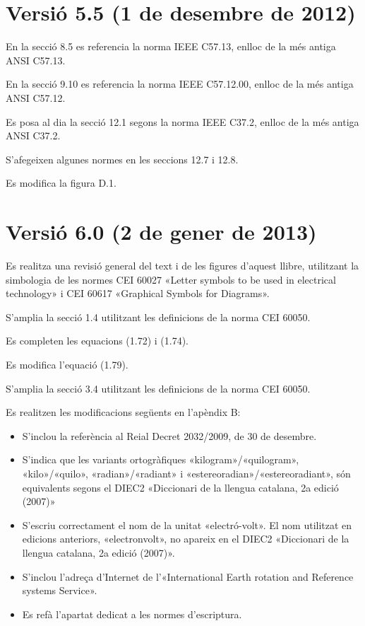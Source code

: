 \section*{Versió 5.5 (1 de desembre de 2012)}

En la secció 8.5 es referencia la norma  IEEE C57.13, enlloc de la més antiga ANSI C57.13.

En la secció 9.10 es referencia la norma  IEEE C57.12.00, enlloc de la més antiga ANSI C57.12.

Es posa al dia la secció 12.1 segons la norma IEEE C37.2, enlloc de la més antiga ANSI C37.2.

S'afegeixen algunes normes en les seccions 12.7 i 12.8.

Es modifica  la figura D.1.


\section*{Versió 6.0 (2 de gener de 2013)}

Es realitza una revisió general del text i de les figures d'aquest  llibre, utilitzant la simbologia de les normes CEI 60027  «Letter symbols to be used in electrical technology» i  CEI 60617  «Graphical Symbols for Diagrams».

S'amplia la secció 1.4 utilitzant les definicions de la norma CEI 60050.

Es completen les equacions (1.72) i (1.74).

Es modifica l'equació (1.79).

S'amplia la secció  3.4 utilitzant les definicions de la norma CEI 60050.

Es realitzen les modificacions següents en l'apèndix B:
\begin{itemize}
   \item  S'inclou la referència al Reial Decret 2032/2009, de 30 de desembre.
   \item S'indica que les variants ortogràfiques  «kilogram»/«quilogram», «kilo»/«quilo», «radian»/«radiant» i
   «estereoradian»/«estereoradiant», són equivalents segons el DIEC2 «Diccionari de la llengua catalana, 2a edició (2007)»
    \item S'escriu correctament el nom de la unitat «electró-volt». El nom  utilitzat en edicions anteriors,   «electronvolt», no apareix en el DIEC2 «Diccionari de la llengua catalana, 2a edició (2007)».
    \item S'inclou l'adreça d'Internet de l'«International Earth rotation and Reference systems Service».
     \item Es refà l'apartat dedicat a les normes d'escriptura.
\end{itemize}

